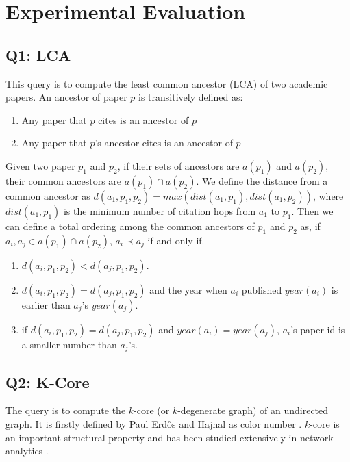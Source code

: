 \section{Experimental Evaluation}


\subsection{Q1: LCA}
This query is to compute the least common ancestor (LCA) of two 
academic papers. An ancestor of paper $p$ is transitively defined as:

\begin{enumerate}
    \item Any paper that $p$ cites is an ancestor of $p$
    \item Any paper that $p$'s ancestor cites is an ancestor of $p$
\end{enumerate} 

Given two paper $p_1$ and $p_2$, if their sets of ancestors are 
$a(p_1)$ and $a(p_2)$, their common ancestors are 
$a(p_1) \cap a(p_2)$. We define the distance from a common ancestor
as $d(a_1, p_1, p_2) = max(dist(a_1, p_1), dist(a_1, p_2))$, where 
$dist(a_1, p_1)$ is the minimum number of citation hops from $a_1$ to 
$p_1$. Then we can define a total ordering among the common ancestors
of $p_1$ and $p_2$ as, if $a_i, a_j \in a(p_1) \cap a(p_2)$, 
$a_i \prec a_j$ if and only if.

\begin{enumerate}
    \item $d(a_i, p_1, p_2) < d(a_j, p_1, p_2)$.
    \item $d(a_i, p_1, p_2) = d(a_j, p_1, p_2)$ and the year when $a_i$
    published $year(a_i)$ is earlier than $a_j$'s $year(a_j)$.
    \item if $d(a_i, p_1, p_2) = d(a_j, p_1, p_2)$ and $year(a_i) = year(a_j)$, $a_i$'s paper id is a smaller number than $a_j$'s.
\end{enumerate}

\subsection{Q2: K-Core}

The query is to compute the $k$-core (or $k$-degenerate graph) 
of an undirected graph. It is firstly defined by Paul Erd\H{o}s 
and Hajnal as color number \cite{ErdosH66}. 
$k$-core is an important structural property
and has been studied extensively in network analytics 
\cite{Alvarez-HamelinDBV05NIPS, ChengKCO11ICDE}.


